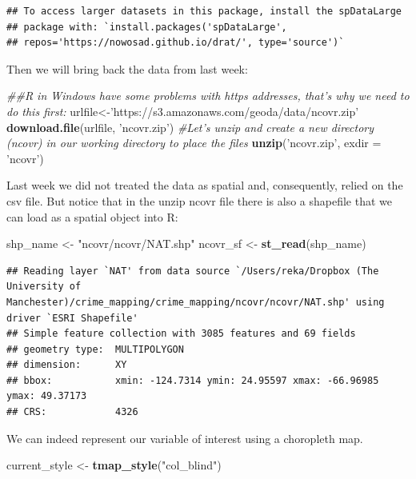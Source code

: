 \documentclass[]{book}
\newenvironment{Shaded}{\begin{snugshade}}{\end{snugshade}}
\newcommand{\CommentTok}[1]{\textcolor[rgb]{0.56,0.35,0.01}{\textit{#1}}}
\newcommand{\DataTypeTok}[1]{\textcolor[rgb]{0.13,0.29,0.53}{#1}}
\newcommand{\KeywordTok}[1]{\textcolor[rgb]{0.13,0.29,0.53}{\textbf{#1}}}
\newcommand{\NormalTok}[1]{#1}
\newcommand{\StringTok}[1]{\textcolor[rgb]{0.31,0.60,0.02}{#1}}
\begin{document}
\begin{verbatim}
## To access larger datasets in this package, install the spDataLarge
## package with: `install.packages('spDataLarge',
## repos='https://nowosad.github.io/drat/', type='source')`
\end{verbatim}

Then we will bring back the data from last week:

\begin{Shaded}
\begin{Highlighting}[]
\CommentTok{##R in Windows have some problems with https addresses, that's why we need to do this first:}
\NormalTok{urlfile<-}\StringTok{'https://s3.amazonaws.com/geoda/data/ncovr.zip'}
\KeywordTok{download.file}\NormalTok{(urlfile, }\StringTok{'ncovr.zip'}\NormalTok{)}
\CommentTok{#Let's unzip and create a new directory (ncovr) in our working directory to place the files}
\KeywordTok{unzip}\NormalTok{(}\StringTok{'ncovr.zip'}\NormalTok{, }\DataTypeTok{exdir =} \StringTok{'ncovr'}\NormalTok{)}
\end{Highlighting}
\end{Shaded}

Last week we did not treated the data as spatial and, consequently, relied on the csv file. But notice that in the unzip ncovr file there is also a shapefile that we can load as a spatial object into R:

\begin{Shaded}
\begin{Highlighting}[]
\NormalTok{shp_name <-}\StringTok{ "ncovr/ncovr/NAT.shp"}
\NormalTok{ncovr_sf <-}\StringTok{ }\KeywordTok{st_read}\NormalTok{(shp_name)}
\end{Highlighting}
\end{Shaded}

\begin{verbatim}
## Reading layer `NAT' from data source `/Users/reka/Dropbox (The University of Manchester)/crime_mapping/crime_mapping/ncovr/ncovr/NAT.shp' using driver `ESRI Shapefile'
## Simple feature collection with 3085 features and 69 fields
## geometry type:  MULTIPOLYGON
## dimension:      XY
## bbox:           xmin: -124.7314 ymin: 24.95597 xmax: -66.96985 ymax: 49.37173
## CRS:            4326
\end{verbatim}

We can indeed represent our variable of interest using a choropleth map.

\begin{Shaded}
\begin{Highlighting}[]
\NormalTok{current_style <-}\StringTok{ }\KeywordTok{tmap_style}\NormalTok{(}\StringTok{"col_blind"}\NormalTok{)}
\end{Highlighting}
\end{Shaded}
\end{document}
